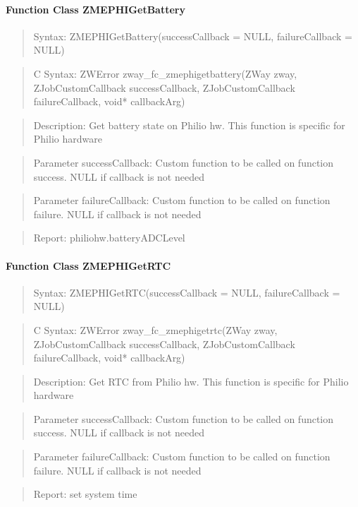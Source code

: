 \paragraph{Function Class ZMEPHIGetBattery}
\begin{quote}Syntax: ZMEPHIGetBattery(successCallback = NULL, failureCallback = NULL)\end{quote}
\begin{quote}C Syntax: ZWError zway\_fc\_zmephigetbattery(ZWay zway, ZJobCustomCallback successCallback, ZJobCustomCallback failureCallback, void* callbackArg)\end{quote}
\begin{quote}Description: Get battery state on Philio hw. This function is specific for Philio hardware\end{quote}
\begin{quote}Parameter successCallback: Custom function to be called on function success. NULL if callback is not needed\end{quote}
\begin{quote}Parameter failureCallback: Custom function to be called on function failure. NULL if callback is not needed\end{quote}
\begin{quote}Report: philiohw.batteryADCLevel\end{quote}

\paragraph{Function Class ZMEPHIGetRTC}
\begin{quote}Syntax: ZMEPHIGetRTC(successCallback = NULL, failureCallback = NULL)\end{quote}
\begin{quote}C Syntax: ZWError zway\_fc\_zmephigetrtc(ZWay zway, ZJobCustomCallback successCallback, ZJobCustomCallback failureCallback, void* callbackArg)\end{quote}
\begin{quote}Description: Get RTC from Philio hw. This function is specific for Philio hardware\end{quote}
\begin{quote}Parameter successCallback: Custom function to be called on function success. NULL if callback is not needed\end{quote}
\begin{quote}Parameter failureCallback: Custom function to be called on function failure. NULL if callback is not needed\end{quote}
\begin{quote}Report: set system time\end{quote}

